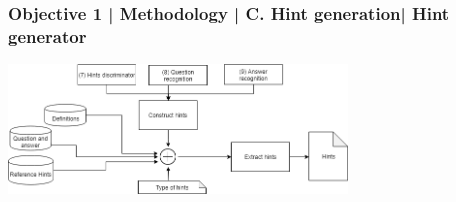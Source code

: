 \documentclass{beamer}
\begin{document}
\begin{frame}
\frametitle{Objective 1 | Methodology | C. Hint generation| Hint generator}
	\includegraphics[width=90mm]{ht2.png}
\end{frame}

\end{document}
